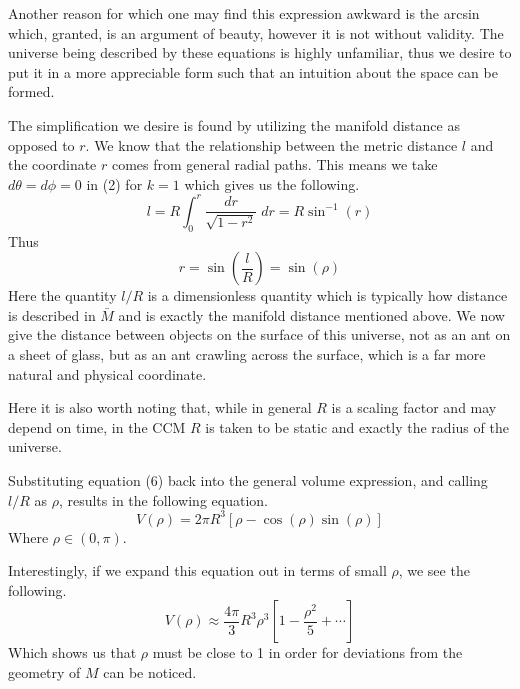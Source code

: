 \documentclass[a4paper]{article}
\begin{document}

    Another reason for which one may find this expression awkward is the
    arcsin which, granted, is an argument of beauty, however it is not without
    validity. The universe being described by these equations is highly
    unfamiliar, thus we desire to put it in a more appreciable form such that
    an intuition about the space can be formed.

    The simplification we desire is found by utilizing the manifold distance as
    opposed to $r$. We know that the relationship between the metric distance
    $l$ and the coordinate $r$ comes from general radial paths. This means we
    take $d\theta = d\phi = 0$ in (2) for $k = 1$ which gives us the following.
    \begin{equation}
        l = R\int_0^r \frac{dr}{\sqrt{1-r^2}}\; dr = R\sin^{-1}(r) 
    \end{equation}
    Thus
    \begin{equation}
        r = \sin(\frac{l}{R}) = \sin(\rho)
    \end{equation}
    Here the quantity $l/R$ is a dimensionless quantity which is typically how
    distance is described in $\bar{M}$ and is exactly the manifold distance
    mentioned above. We now give the distance between objects on the surface of
    this universe, not as an ant on a sheet of glass, but as an ant crawling
    across the surface, which is a far more natural and physical coordinate.

    Here it is also worth noting that, while in general $R$ is a scaling factor
    and may depend on time, in the CCM $R$ is taken to be static and exactly
    the radius of the universe.

    Substituting equation (6) back into the general volume expression, and
    calling $l/R$ as $\rho$, results in the following equation.
    \begin{equation}
        V(\rho) = 2 \pi R^3 \left[ \rho - \cos(\rho)\sin(\rho) \right]
    \end{equation}
    Where $\rho \in (0,\pi)$. 

    Interestingly, if we expand this equation out in terms of small $\rho$, we see
    the following.
    \begin{equation*}
        V(\rho) \approx \frac{4\pi}{3} R^3 \rho^3 \left[1 - \frac{\rho^2}{5} +
        \cdots \right] 
    \end{equation*}
    Which shows us that $\rho$ must be close to 1 in order for deviations from
    the geometry of $M$ can be noticed.
\end{document}

